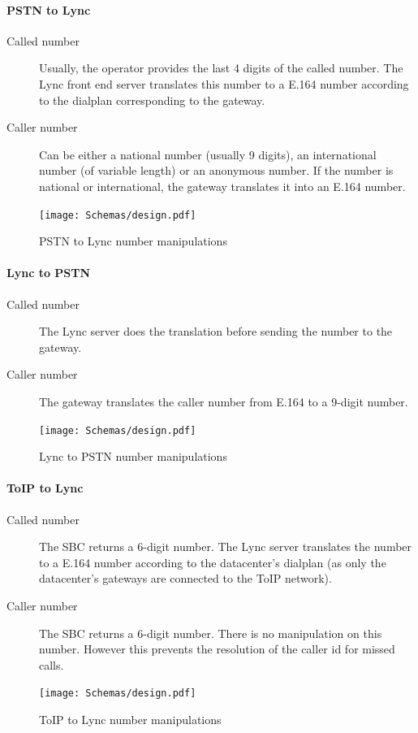	\paragraph{PSTN to Lync}
	\begin{description}
		\item[Called number] Usually, the operator provides the last 4 digits of the called number. The Lync front end server translates this number to a E.164 number according to the dialplan corresponding to the gateway.
		\item[Caller number] Can be either a national number (usually 9 digits), an international number (of variable length) or an anonymous number. If the number is national or international, the gateway translates it into an E.164 number.
	\end{description}
	\begin{figure}[H]
		\centering
		\texttt{[image: Schemas/design.pdf]}
		\caption{PSTN to Lync number manipulations}
		\label{fig:case_pstn_to_lync}
	\end{figure}

	\paragraph{Lync to PSTN}
	\begin{description}
		\item[Called number] The Lync server does the translation before sending the number to the gateway.
		\item[Caller number] The gateway translates the caller number from E.164 to a 9-digit number.
	\end{description}
	\begin{figure}[H]
		\centering
		\texttt{[image: Schemas/design.pdf]}
		\caption{Lync to PSTN number manipulations}
		\label{fig:case_lync_to_pstn}
	\end{figure}

	\paragraph{ToIP to Lync}
	\begin{description}
		\item[Called number] The SBC returns a 6-digit number. The Lync server translates the number to a E.164 number according to the datacenter's dialplan (as only the datacenter's gateways are connected to the ToIP network).
		\item[Caller number] The SBC returns a 6-digit number. There is no manipulation on this number. However this prevents the resolution of the caller id for missed calls.
	\end{description}
	\begin{figure}[H]
		\centering
		\texttt{[image: Schemas/design.pdf]}
		\caption{ToIP to Lync number manipulations}
		\label{fig:case_toip_to_lync}
	\end{figure}

